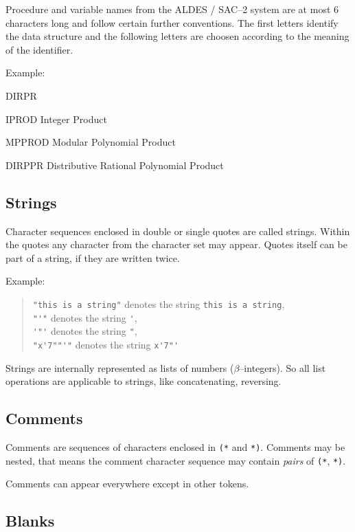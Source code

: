 Procedure and variable names from the ALDES / SAC--2 system
are at most 6 characters long and follow certain 
further conventions. The first letters identify the 
data structure and the following letters are choosen 
according to the meaning of the identifier.

Example:
\begin{deflist}{DIRPR}
\item[IPROD]  Integer Product 
\item[MPPROD] Modular Polynomial Product 
\item[DIRPPR] Distributive Rational Polynomial Product
\end{deflist}

\subsection{Strings}

Character sequences enclosed in double or single quotes
are called strings.
Within the quotes any character from the character set
may appear. Quotes itself can be part of a string, if
they are written twice.

Example:
\begin{quote}
       \verb/"this is a string"/ denotes the string
       \verb/this is a string/, \\
       \verb/"'"/ denotes the string \verb/'/, \\
       \verb/'"'/ denotes the string \verb/"/, \\
       \verb/"x'7""'"/ denotes the string \verb/x'7"'/
\end{quote} 

Strings are internally represented as lists of numbers 
($\beta$--integers). So all list operations are applicable to
strings, like concatenating, reversing.
 

\subsection{Comments}

Comments are sequences of characters enclosed in
\verb/(*/ and \verb/*)/.
Comments may be nested, that means the comment character 
sequence may contain {\em pairs} of \verb/(*/, \verb/*)/.
\index{\verb/(*/}\index{\verb/*)/}

Comments can appear everywhere except in other tokens.


\subsection{Blanks}

